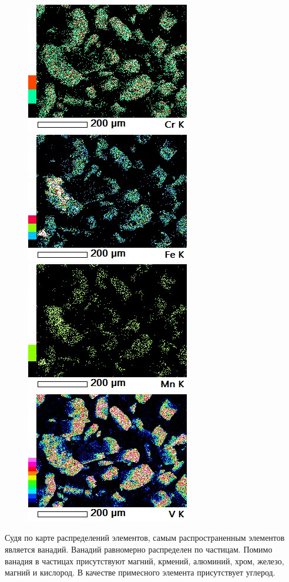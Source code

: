 \documentclass[14pt]{extarticle}
\begin{document}
\begin{figure}[H]
	\includegraphics[width = 0.45\linewidth]{./pictures/map1_Cr_K.jpg} \hspace{1em}%
	\includegraphics[width = 0.45\linewidth]{./pictures/map1_Fe_K.jpg} \hspace{1em}%
	\includegraphics[width = 0.45\linewidth]{./pictures/map1_Mn_K.jpg} \hspace{4.2em}%
	\includegraphics[width = 0.45\linewidth]{./pictures/map1_V_K.jpg} \hspace{1em}%
\end{figure}

Судя по карте распределений элементов, самым распространенным элементов является ванадий. Ванадий равномерно распределен по частицам. Помимо ванадия в частицах присутствуют магний, крмений, алюминий, хром, железо, магний и кислород. В качестве примесного элемента присутствует углерод. 
\end{document}
